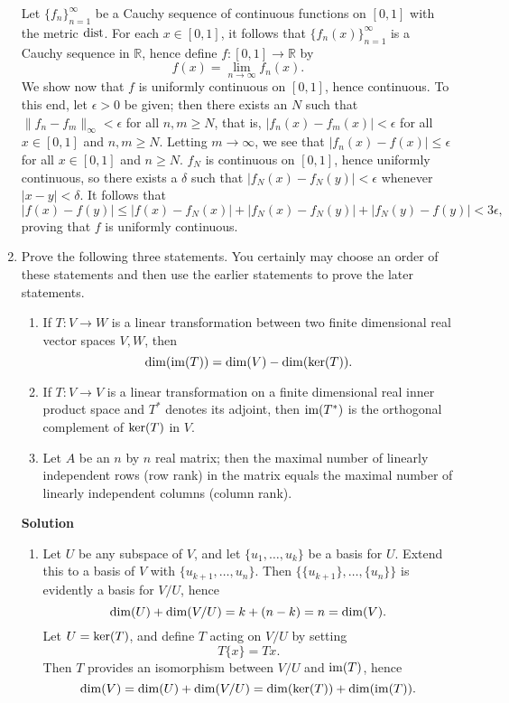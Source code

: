 \documentclass{article}
\def\dist{\mathop{\rm dist}\nolimits}
\def\dim{\mathop{\rm dim}\nolimits}
\def\im{\mathop{\rm im}\nolimits}
\def\ker{\mathop{\rm ker}\nolimits}
\begin{document}
\begin{enumerate}
Let \(\{f_n\}_{n = 1}^{\infty}\) be a Cauchy sequence of continuous functions on \([0,1]\) with the metric \(\dist\).  For each \(x \in [0,1]\), it follows that \(\{f_n(x)\}_{n = 1}^{\infty}\) is a Cauchy sequence in \(\mathbb{R}\), hence define \(f : [0,1] \to \mathbb{R}\) by
\[f(x) = \lim_{n \to \infty} f_n(x).\]
We show now that \(f\) is uniformly continuous on \([0,1]\), hence continuous.  To this end, let \(\epsilon > 0\) be given; then there exists an \(N\) such that \(\|f_n - f_m\|_{\infty} < \epsilon\) for all \(n,m \geq N\), that is, \(|f_n(x) - f_m(x)| < \epsilon\) for all \(x \in [0,1]\) and \(n,m \geq N\).  Letting \(m \to \infty\), we see that \(|f_n(x) - f(x)| \leq \epsilon\) for all \(x \in [0,1]\) and \(n \geq N\).  \(f_N\) is continuous on \([0,1]\), hence uniformly continuous, so there exists a \(\delta\) such that \(|f_N(x) - f_N(y)| < \epsilon\) whenever \(|x - y| < \delta\).  It follows that
\[|f(x) - f(y)| \leq |f(x) - f_N(x)| + |f_N(x) - f_N(y)| + |f_N(y) - f(y)| < 3\epsilon,\]
proving that \(f\) is uniformly continuous.



\item Prove the following three statements.  You certainly may choose an order of these statements and then use the earlier statements to prove the later statements.

\begin{enumerate}
\item If \(T : V \to W\) is a linear transformation between two finite dimensional real vector spaces \(V,W\), then
\[\dim(\im(T)) = \dim(V) - \dim(\ker(T)).\]

\item If \(T : V \to V\) is a linear transformation on a finite dimensional real inner product space and \(T^*\) denotes its adjoint, then \(\im(T^*)\) is the orthogonal complement of \(\ker(T)\) in \(V\).

\item Let \(A\) be an \(n\) by \(n\) real matrix; then the maximal number of linearly independent rows (row rank) in the matrix equals the maximal number of linearly independent columns (column rank).

\end{enumerate}

{\bf Solution}

\begin{enumerate}
\item Let \(U\) be any subspace of \(V\), and let \(\{u_1, \ldots, u_k\}\) be a basis for \(U\).  Extend this to a basis of \(V\) with \(\{u_{k + 1}, \ldots, u_n\}\).  Then \(\{\{u_{k + 1}\}, \ldots, \{u_n\}\}\) is evidently a basis for \(V/U\), hence
\[\dim(U) + \dim(V/U) = k + (n - k) = n = \dim(V).\]
Let \(U = \ker(T)\), and define \(T\) acting on \(V/U\) by setting
\[T\{x\} = Tx.\]
Then \(T\) provides an isomorphism between \(V/U\) and \(\im(T)\), hence
\[\dim(V) = \dim(U) + \dim(V/U) = \dim(\ker(T)) + \dim(\im(T)).\]


\end{enumerate}
\end{enumerate}
\end{document}

